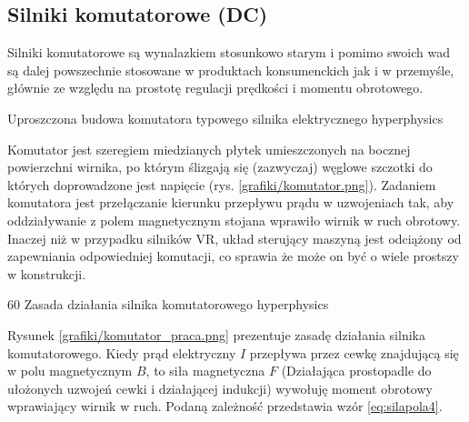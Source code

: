 \subsection{Silniki komutatorowe (DC)}

Silniki komutatorowe są wynalazkiem stosunkowo starym i pomimo swoich wad są dalej powszechnie stosowane w produktach konsumenckich jak i w przemyśle, głównie ze względu na prostotę regulacji prędkości i momentu obrotowego.

		{Uproszczona budowa komutatora typowego silnika elektrycznego}
		{hyperphysics}
		
Komutator jest szeregiem miedzianych płytek umieszczonych na bocznej powierzchni wirnika, po którym ślizgają się (zazwyczaj) węglowe szczotki do których doprowadzone jest napięcie (rys. \ref{grafiki/komutator.png}). Zadaniem komutatora jest przełączanie kierunku przepływu prądu w uzwojeniach tak, aby oddziaływanie z polem magnetycznym stojana wprawiło wirnik w ruch obrotowy. Inaczej niż w przypadku silników VR, układ sterujący maszyną jest odciążony od zapewniania odpowiedniej komutacji, co sprawia że może on być o wiele prostszy w konstrukcji. 

		{60}
		{Zasada działania silnika komutatorowego}
		{hyperphysics}
		
Rysunek \ref{grafiki/komutator_praca.png} prezentuje zasadę działania silnika komutatorowego. Kiedy prąd elektryczny $ I $ przepływa przez cewkę znajdującą się w polu magnetycznym $ B $, to siła magnetyczna $ F $ (Działająca prostopadle do ułożonych uzwojeń cewki i działającej indukcji)  wywołuję moment obrotowy wprawiający wirnik w ruch. Podaną zależność przedstawia wzór \ref{eq:silapola4}.

\clearpage

